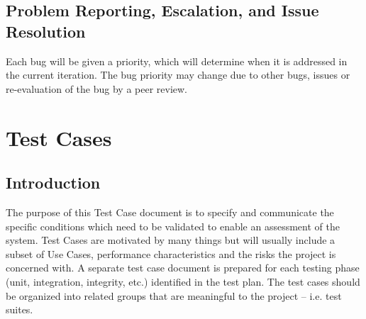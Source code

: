 \subsection{Problem Reporting, Escalation, and Issue Resolution}
Each bug will be given a priority, which will determine when it is addressed in the current iteration. The bug priority may change due to other bugs, issues or re-evaluation of the bug by a peer review.

\section{Test Cases}
\subsection{Introduction}
The purpose of this Test Case document is to specify and communicate the specific
conditions which need to be validated to enable an assessment of the system. Test
Cases are motivated by many things but will usually include a subset of Use Cases,
performance characteristics and the risks the project is concerned with.
A separate test case document is prepared for each testing phase (unit,
integration, integrity, etc.) identified in the test plan. The test cases should be
organized into related groups that are meaningful to the project – i.e. test suites.

